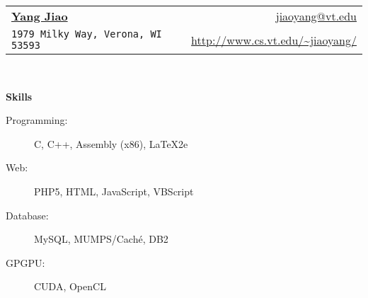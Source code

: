 \documentclass[letterpaper,11pt]{article}
\newcommand{\resheading}[1]{{\large \colorbox{mygrey}{\begin{minipage}{\textwidth}{\textbf{#1 \vphantom{p\^{E}}}}\end{minipage}}}}
\begin{document}
\newcommand{\mywebheader}{
\begin{tabular*}{7in}{l@{\extracolsep{\fill}}r}
	\textbf{\href{http://www.cs.vt.edu/~jiaoyang/}{\LARGE Yang Jiao}}
	& \href{mailto:jiaoyang@cs.vt.edu}{\url{jiaoyang@vt.edu}}\\
	{\footnotesize \texttt{1979 Milky Way, Verona, WI 53593}} &
	\href{http://www.cs.vt.edu/\%7ejiaoyang/}{\url{http://www.cs.vt.edu/~jiaoyang/}}
	\\
	\end{tabular*}
\\
\vspace{0.1in}}

\mywebheader

\resheading{Skills}
	\begin{description}
		\item[Programming:] { \footnotesize C, C++, Assembly (x86),
		\LaTeX2e}
		\item[Web:] { \footnotesize PHP5, HTML, JavaScript, VBScript}
		\item[Database:]{ \footnotesize MySQL, MUMPS/Cach\'e, DB2} 
		\item[GPGPU:]{ \footnotesize CUDA, OpenCL} 
	\end{description} %
\end{document}
